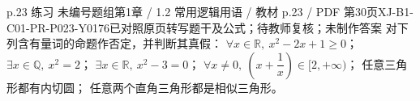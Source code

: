 \par\noindent\begin{minipage}{\linewidth}
\begin{bankitem}{p.23 练习 未编号题组}{第1章 / 1.2 常用逻辑用语 / 教材 p.23 / PDF 第30页}{XJ-B1-C01-PR-P023-Y0176}{已对照原页转写题干及公式；待教师复核；未制作答案}
对下列含有量词的命题作否定，并判断其真假：
$\forall x\in\mathbb R,\ x^2-2x+1\ge0$；
$\exists x\in\mathbb Q,\ x^2=2$；
$\exists x\in\mathbb R,\ x^2-3=0$；
$\forall x\ne0,\ \left(x+\dfrac1x\right)\in[2,+\infty)$；
任意三角形都有内切圆；
任意两个直角三角形都是相似三角形。
\end{bankitem}
\end{minipage}\par\medskip
